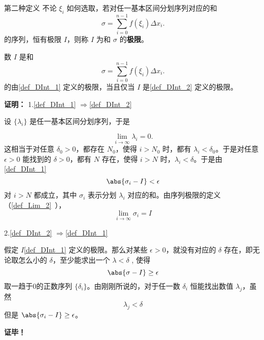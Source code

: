 \begin{definition}{第二种定义}
不论 $\xi_i$ 如何选取，若对任一基本区间分划序列对应的和 
\begin{equation}
\sigma=\sum_{i=0}^{n-1}f(\xi_i)\Delta x_i.
\end{equation}
的序列，恒有极限 $I$，则称 $I$ 为和 $\sigma$ 的\textbf{极限}。
\end{definition}
\begin{theorem}{}
数 $I$ 是和 
\begin{equation}
\sigma=\sum_{i=0}^{n-1}f(\xi_i)\Delta x_i.
\end{equation}
的由\autoref{def_DInt_1} 定义的极限，当且仅当 $I$ 是\autoref{def_DInt_2} 定义的极限。
\end{theorem}
\textbf{证明：}
1.\autoref{def_DInt_1} $\Rightarrow$\autoref{def_DInt_2} 

设 $\{\lambda_i\}$ 是任一基本区间分划序列，于是 

\begin{equation}
\lim\limits_{i\rightarrow\infty}\lambda_i=0.
\end{equation}
这相当于对任意 $\delta_0>0$，都存在 $N_0$，使得 $i>N_0$ 时，都有 $\lambda_i<\delta_0$。于是对任意 $\epsilon>0$ 能找到的 $\delta>0$，都有 $N$ 存在，使得 $i>N$ 时，$\lambda_i<\delta$。于是由\autoref{def_DInt_1} 
\begin{equation}
\abs{\sigma_i-I}<\epsilon
\end{equation}
对 $i>N$ 都成立，其中 $\sigma_i$ 表示分划 $\lambda_i$ 对应的和。由序列极限的定义（\autoref{def_Lim_2}~），
\begin{equation}
\lim_{i\rightarrow\infty} \sigma_i=I
\end{equation}

2.\autoref{def_DInt_2} $\Rightarrow$\autoref{def_DInt_1} 

假定 $I$\autoref{def_DInt_1} 定义的极限。那么对某些 $\epsilon>0$，就没有对应的 $\delta$ 存在，即无论取怎么小的 $\delta$，至少能求出一个 $\lambda<\delta$ , 使得
\begin{equation}
\abs{\sigma-I}\geq\epsilon
\end{equation}
取一趋于0的正数序列 $\{\delta_i\}$。由刚刚所说的，对于任一数 $\delta_i$ 恒能找出数值 $\lambda_j$，虽然
\begin{equation}
\lambda_j<\delta
\end{equation}
但是 $\abs{\sigma_i-I}\geq\epsilon$。

\textbf{证毕！}